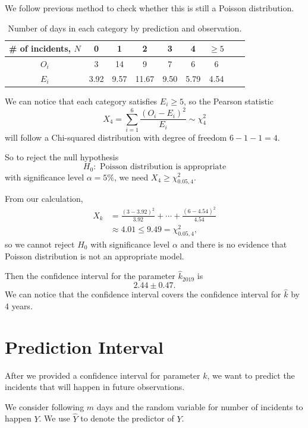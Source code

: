 \documentclass[11pt,a4paper,english]{article}
\begin{document}
We follow previous method to check whether this is still a Poisson distribution.
\begin{table}[htbp]
	\centering
	\begin{tabular}{c|cccccccc}
		\hline
		\# of incidents, $N$ & 0 & 1 & 2 & 3 & 4 & $\geq 5$\\
		\hline
		$O_{i}$ & 3 & 14 & 9 & 7 & 6 & 6\\
		\hline
		$E_{i}$ & 3.92 & 9.57 & 11.67 & 9.50 & 5.79 & 4.54\\
		\hline
	\end{tabular}
	\caption{Number of days in each category by prediction and observation.}
\end{table}
We can notice that each category satisfies $E_{i} \geq 5$, so the Pearson statistic 
\begin{equation*}
X_{4} = \sum_{i = 1}^{6}\frac{(O_{i}-E_{i})^{2}}{E_{i}} \sim \chi^{2}_{4}
\end{equation*}
will follow a Chi-squared distribution with degree of freedom $6-1-1 = 4$.

So to reject the null hypothesis 
\begin{equation*}
	H_{0}:\text{ Poisson distribution is appropriate}
\end{equation*}
with significance level $\alpha = 5\%$, we need $X_{4} \geq \chi^{2}_{0.05,4}$.

From our calculation,
\begin{align*}
	X_{k} &= \frac{(3-3.92)^{2}}{3.92}+\cdots+\frac{(6-4.54)^{2}}{4.54}\\
	&\approx 4.01 \leq 9.49  = \chi^{2}_{0.05,4},
\end{align*}
so we cannot reject $H_{0}$ with significance level $\alpha$ and there is no evidence that Poisson distribution is not an appropriate model.

Then the confidence interval for the parameter $\hat{k}_{2019}$ is 
\begin{equation*}
	2.44 \pm 0.47.
\end{equation*}
We can notice that the confidence interval covers the confidence interval for $\hat{k}$ by 4 years. 
\section{Prediction Interval}
After we provided a confidence interval for parameter $k$, we want to predict the incidents that will happen in future observations.

We consider following $m$ days and the random variable for number of incidents to happen $Y$. We use $\hat{Y}$ to denote the predictor of $Y$.
\end{document}
